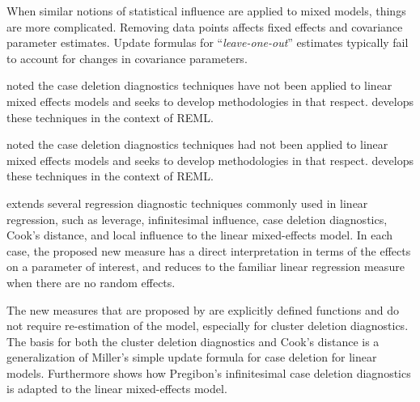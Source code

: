 \documentclass[12pt, a4paper]{report}
\theoremstyle{plain}
\theoremstyle{definition}
\theoremstyle{remark}
\begin{document}
	
	
	When similar notions of statistical influence are applied to mixed models,
	things are more complicated. Removing data points affects fixed effects and covariance parameter estimates.
	Update formulas for “\textit{leave-one-out}” estimates typically fail to account for changes in covariance
	parameters. 
	
	\citet{Christensen} noted the case deletion diagnostics techniques have not been applied to linear mixed effects models and seeks to develop methodologies in that respect. \citet{Christensen} develops these techniques in the context of REML.

	\citet{Christensen} noted the case deletion diagnostics techniques had not been applied to linear mixed effects models and seeks to develop methodologies in that respect. \citet{Christensen} develops these techniques in the context of REML.
	
	
	
	
	\citet{Demi} extends several regression diagnostic techniques commonly used in linear regression, such as leverage, infinitesimal influence, case deletion diagnostics, Cook's distance, and local influence to the linear mixed-effects model. In each case, the proposed new measure has a direct interpretation in terms of the effects on a parameter of interest, and reduces to the familiar linear regression measure when there are no random effects. 
	
	The new measures that are proposed by \citet{Demi} are explicitly defined functions and do not require re-estimation of the model, especially for cluster deletion diagnostics. The basis for both the cluster deletion diagnostics and Cook's distance is a generalization of Miller's simple update formula for case deletion for linear models. Furthermore \citet{Demi} shows how Pregibon's infinitesimal case deletion diagnostics is adapted to the linear mixed-effects model. 
	
\end{document}
